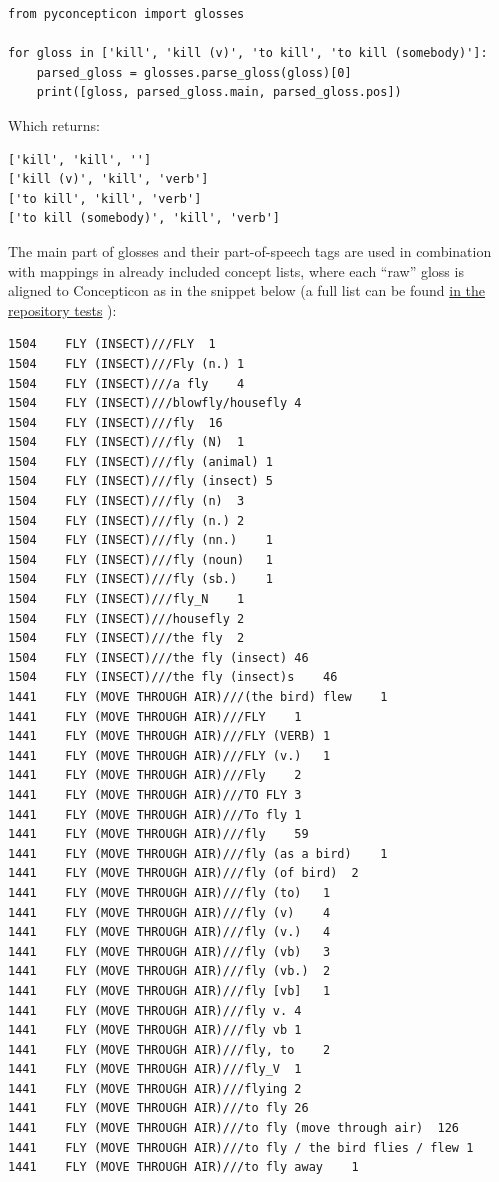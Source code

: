 \documentclass[
  a4paper,
  14pt,
  oneside,
  tablecaptionabove
]{scrbook}
\begin{document}
\begin{lstlisting}
from pyconcepticon import glosses

for gloss in ['kill', 'kill (v)', 'to kill', 'to kill (somebody)']:
    parsed_gloss = glosses.parse_gloss(gloss)[0]
    print([gloss, parsed_gloss.main, parsed_gloss.pos])
\end{lstlisting}

Which returns:

\begin{lstlisting}
['kill', 'kill', '']
['kill (v)', 'kill', 'verb']
['to kill', 'kill', 'verb']
['to kill (somebody)', 'kill', 'verb']
\end{lstlisting}

The main part of glosses and their part-of-speech tags are used in
combination with mappings in already included concept lists, where each
\enquote{raw} gloss is aligned to Concepticon as in the snippet below (a
full list can be found
\href{https://github.com/concepticon/pyconcepticon/blob/master/tests/fixtures/mappings/map-en.tsv}{in
the repository tests} ):

\begin{lstlisting}
1504    FLY (INSECT)///FLY  1
1504    FLY (INSECT)///Fly (n.) 1
1504    FLY (INSECT)///a fly    4
1504    FLY (INSECT)///blowfly/housefly 4
1504    FLY (INSECT)///fly  16
1504    FLY (INSECT)///fly (N)  1
1504    FLY (INSECT)///fly (animal) 1
1504    FLY (INSECT)///fly (insect) 5
1504    FLY (INSECT)///fly (n)  3
1504    FLY (INSECT)///fly (n.) 2
1504    FLY (INSECT)///fly (nn.)    1
1504    FLY (INSECT)///fly (noun)   1
1504    FLY (INSECT)///fly (sb.)    1
1504    FLY (INSECT)///fly_N    1
1504    FLY (INSECT)///housefly 2
1504    FLY (INSECT)///the fly  2
1504    FLY (INSECT)///the fly (insect) 46
1504    FLY (INSECT)///the fly (insect)s    46
1441    FLY (MOVE THROUGH AIR)///(the bird) flew    1
1441    FLY (MOVE THROUGH AIR)///FLY    1
1441    FLY (MOVE THROUGH AIR)///FLY (VERB) 1
1441    FLY (MOVE THROUGH AIR)///FLY (v.)   1
1441    FLY (MOVE THROUGH AIR)///Fly    2
1441    FLY (MOVE THROUGH AIR)///TO FLY 3
1441    FLY (MOVE THROUGH AIR)///To fly 1
1441    FLY (MOVE THROUGH AIR)///fly    59
1441    FLY (MOVE THROUGH AIR)///fly (as a bird)    1
1441    FLY (MOVE THROUGH AIR)///fly (of bird)  2
1441    FLY (MOVE THROUGH AIR)///fly (to)   1
1441    FLY (MOVE THROUGH AIR)///fly (v)    4
1441    FLY (MOVE THROUGH AIR)///fly (v.)   4
1441    FLY (MOVE THROUGH AIR)///fly (vb)   3
1441    FLY (MOVE THROUGH AIR)///fly (vb.)  2
1441    FLY (MOVE THROUGH AIR)///fly [vb]   1
1441    FLY (MOVE THROUGH AIR)///fly v. 4
1441    FLY (MOVE THROUGH AIR)///fly vb 1
1441    FLY (MOVE THROUGH AIR)///fly, to    2
1441    FLY (MOVE THROUGH AIR)///fly_V  1
1441    FLY (MOVE THROUGH AIR)///flying 2
1441    FLY (MOVE THROUGH AIR)///to fly 26
1441    FLY (MOVE THROUGH AIR)///to fly (move through air)  126
1441    FLY (MOVE THROUGH AIR)///to fly / the bird flies / flew 1
1441    FLY (MOVE THROUGH AIR)///to fly away    1
\end{lstlisting}
\end{document}
